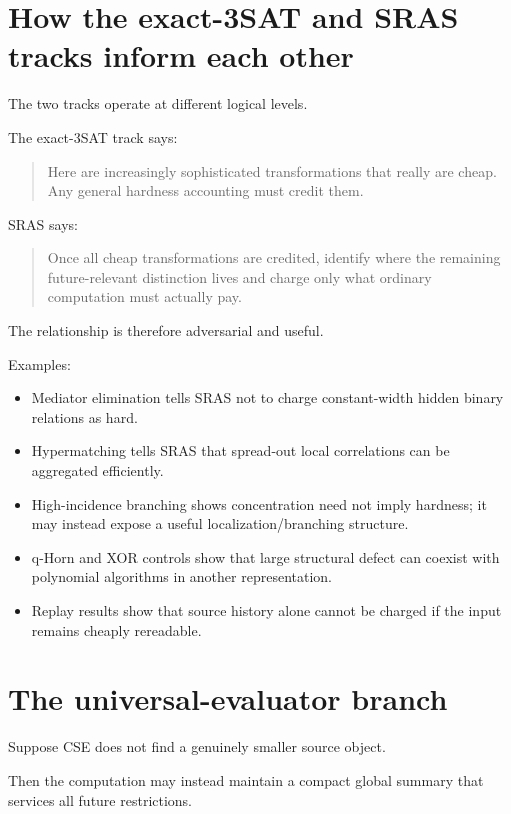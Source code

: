 \documentclass[11pt]{article}
\theoremstyle{plain}
\theoremstyle{definition}
\theoremstyle{remark}
\begin{document}
\section{How the exact-3SAT and SRAS tracks inform each other}

The two tracks operate at different logical levels.

The exact-3SAT track says:
\begin{quote}
Here are increasingly sophisticated transformations that really are cheap.
Any general hardness accounting must credit them.
\end{quote}

SRAS says:
\begin{quote}
Once all cheap transformations are credited, identify where the remaining
future-relevant distinction lives and charge only what ordinary computation
must actually pay.
\end{quote}

The relationship is therefore adversarial and useful.

Examples:

\begin{itemize}[leftmargin=1.4em]
\item Mediator elimination tells SRAS not to charge constant-width hidden
binary relations as hard.

\item Hypermatching tells SRAS that spread-out local correlations can be
aggregated efficiently.

\item High-incidence branching shows concentration need not imply hardness; it
may instead expose a useful localization/branching structure.

\item q-Horn and XOR controls show that large structural defect can coexist
with polynomial algorithms in another representation.

\item Replay results show that source history alone cannot be charged if the
input remains cheaply rereadable.
\end{itemize}

\section{The universal-evaluator branch}

Suppose CSE does not find a genuinely smaller source object.

Then the computation may instead maintain a compact global summary that
services all future restrictions.
\end{document}
